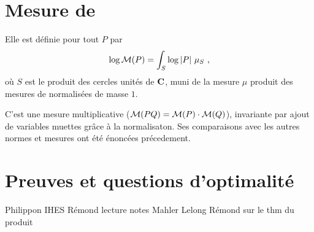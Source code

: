 \section{Mesure de \texorpdfstring{}{Mahler}}

Elle est définie pour tout $P$ par 
\[
  \log\mathcal{M}(P) 
  = \int_S \log\left\lvert P\right\rvert\, \mu_S \text{ ,}
\]
où $S$ est le produit des cercles unités de $\mathbf{C}$, muni de la mesure $\mu$
produit des mesures de  normalisées de masse $1$. 

C'est une mesure multiplicative ($\mathcal{M}(PQ) = \mathcal{M}(P) \cdot \mathcal{M}(Q)$),
invariante par ajout de variables muettes grâce à la normalisaton. 
Ses comparaisons avec les autres normes et mesures ont été énoncées
précedement.

\section{Preuves et questions d'optimalité}

\begin{thebibliography}{9}
   Philippon IHES
   Rémond lecture notes
   Mahler
   Lelong
   Rémond sur le thm du produit
\end{thebibliography}


